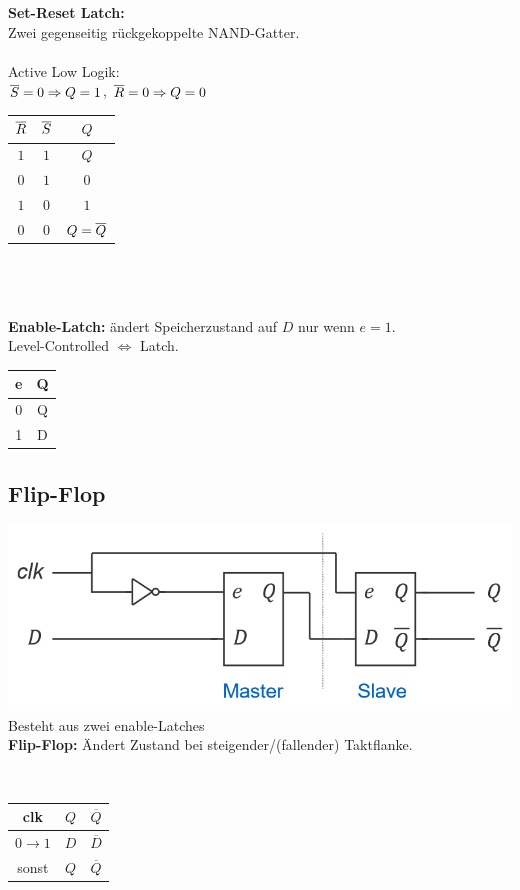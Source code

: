 \documentclass[6pt,a4paper]{scrartcl}
\renewcommand{\emph}[1]{\textsf{\textbf{#1}}}
\newcommand{\ol}[1]{\ensuremath{\overline{#1}}}									%
\newcommand{\ra}[0]{\ensuremath{\rightarrow}} 									%
\newcommand{\n}[0]{\ensuremath{\overline}}										%
\begin{document}
\begin{multicols*}{3}
\begin{minipage}{0.35\linewidth}
	\end{minipage}\hspace{5pt}
	\begin{minipage}{0.48\linewidth}
				\emph{Set-Reset Latch:} \\ Zwei gegenseitig rückgekoppelte NAND-Gatter.\\\\ Active Low Logik:\\ $\n{S}=0\Rightarrow Q=1$, $\n{R}=0\Rightarrow Q=0$
				\begin{tabular}{c|c|c}
					$\n{R}$ & $\n{S}$ & $Q$ \\ \hline
					$1$ & $1$ & $Q$ \\
					$0$ & $1$ & $0$ \\
					$1$ & $0$ & $1$ \\
					$0$ & $0$ & $Q=\n{Q}$
				\end{tabular}
				\\\\\\
				\emph{Enable-Latch:} ändert Speicherzustand auf $D$ nur wenn $e=1$.\\Level-Controlled $\Leftrightarrow$ Latch.\\
				\begin{tabular}{c|c} e & Q \\ \hline 0 & Q \\ 1 & D \end{tabular}
	\end{minipage}


	\subsection{Flip-Flop}
		\parbox{5cm} {
						\includegraphics[width=\linewidth]{img/logic/flip-flop}
			Besteht aus zwei enable-Latches \\
			\emph{Flip-Flop:} Ändert Zustand bei steigender/(fallender) Taktflanke.\\
		}
		\parbox{.25cm}{\ }
		\parbox{2cm}{
			\begin{tabular}{c|c|c} clk & $Q$ & $\ol Q$ \\ \hline $0 \ra 1$ & $D$ & $\ol D$ \\ sonst & $Q$ & $\ol Q$ \end{tabular}
		}


\end{multicols*}
\end{document}
